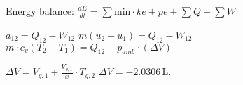 Energy balance:  
\( \frac{dE}{dt} = \sum \text{min} \cdot ke + pe + \sum Q - \sum W \)  

\( a_{12} = Q_{12} - W_{12} \)  
\( m(u_2 - u_1) = Q_{12} - W_{12} \)  
\( m \cdot c_v (T_2 - T_1) = Q_{12} - p_{amb} \cdot (\Delta V) \)  

\( \Delta V = V_{g,1} + \frac{V_{g,1}}{x} \cdot T_{g,2} \)  
\( \Delta V = -2.0306 \, \text{L} \).